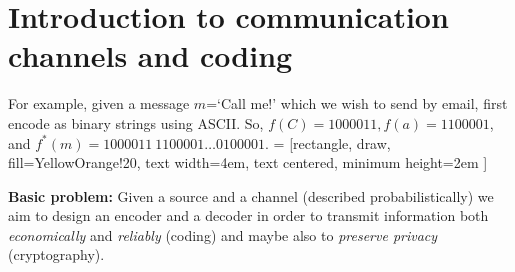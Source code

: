\documentclass{article}
\newcommand{\1}[1]{\mathbbm{1}_{#1}}
\begin{document}
\maketitle
\tableofcontents

\clearpage
\section*{Introduction to communication channels and coding}
For example, given a message $m$=`Call me!' which we wish to send by email, first encode as binary strings using ASCII.
So, $f(C) = 1000011, f(a) = 1100001$, and $f^*(m) = 1000011\ 1100001 \dots 0100001$.
 = [rectangle, draw, fill=YellowOrange!20,
    text width=4em,
    text centered,
    minimum height=2em
    ]
\begin{center}
\end{center}

\textbf{Basic problem:} Given a source and a channel (described probabilistically) we aim to design an encoder and a decoder in order to transmit information both \emph{economically} and \emph{reliably} (coding) and maybe also to \emph{preserve privacy} (cryptography).
\end{document}
